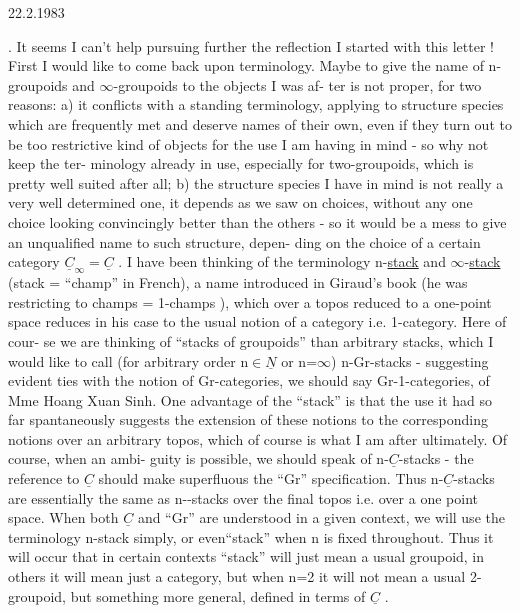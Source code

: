
 22.2.1983

. It seems I can't help pursuing further the reflection I started with
this letter ! First I would like to come back upon terminology. Maybe
to give the name of n-groupoids and $\infty$-groupoids to the objects I was af-%
ter is not proper, for two reasons: a) it conflicts with a standing
terminology, applying to structure species which are frequently met and
deserve names of their own, even if they turn out to be too restrictive
kind of objects for the use I am having in mind - so why not keep the ter-%
minology already in use, especially for two-groupoids, which is
pretty well suited after all; b) the structure species I have in mind
is not really a very well determined one, it depends as we saw on choices,
without any one choice looking convincingly better than the others - so
it would be a mess to give an unqualified name to such structure, depen-%
ding on the choice of a certain category $\underline{C}_{\infty} = \underline{C}$ . I have been thinking
of the terminology n-\uline{stack} and $\infty$-\uline{stack} (stack = ``champ'' in French),
a name introduced in Giraud's book (he was restricting to champs =
1-champs ), which over a topos reduced to a one-point space reduces in
his case to the usual notion of a category i.e. 1-category. Here of cour-%
se we are thinking of ``stacks of groupoids''  than arbitrary stacks,
which I would like to call (for arbitrary order n$\in\underline{N}$ or n=$\infty$) n-Gr-stacks
- suggesting evident ties with the notion of Gr-categories, we should
say Gr-1-categories, of Mme Hoang Xuan Sinh. One advantage of the 
``stack'' is that the use it had so far spantaneously suggests the extension
of these notions to the corresponding notions over an arbitrary topos,
which of course is what I am after ultimately. Of course, when an ambi-%
guity is possible, we should speak of  n-$\underline{C}$-stacks - the reference to
$\underline{C}$ should make superfluous the ``Gr'' specification. Thus n-$\underline{C}$-stacks are
essentially the same as n--stacks over the final topos i.e. over a one
point space. When both $\underline{C}$ and ``Gr'' are understood in a given context, we
will use the  terminology n-stack simply, or even``stack''
when n is fixed throughout. Thus it will occur that in certain contexts
``stack'' will just mean a usual groupoid,  in others it
will mean just a category,  but when n=2 it will not mean
a usual 2-groupoid, but something more general, defined in terms of $\underline{C}$ .

